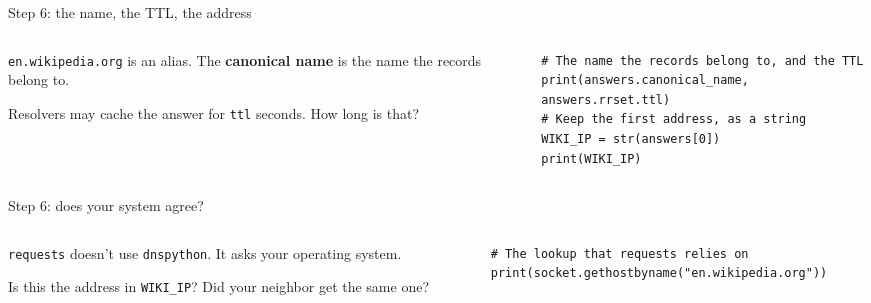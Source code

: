 \documentclass[9pt,aspectratio=169]{beamer}
\begin{document}
\begin{frame}[fragile]{Step 6: the name, the TTL, the address}
    \begin{columns}[T]
        \begin{column}{0.37\textwidth}
            \texttt{en.wikipedia.org} is an alias. The \textbf{canonical name} is the name the records belong to.

            \medskip
            Resolvers may cache the answer for \texttt{ttl} seconds. How long is that?
        \end{column}
        \begin{column}{0.6\textwidth}
\begin{lstlisting}[style=lab]
# The name the records belong to, and the TTL
print(answers.canonical_name, answers.rrset.ttl)
# Keep the first address, as a string
WIKI_IP = str(answers[0])
print(WIKI_IP)
\end{lstlisting}
        \end{column}
    \end{columns}
\end{frame}

\begin{frame}[fragile]{Step 6: does your system agree?}
    \begin{columns}[T]
        \begin{column}{0.37\textwidth}
            \texttt{requests} doesn't use \texttt{dnspython}. It asks your operating system.

            \medskip
            Is this the address in \texttt{WIKI\_IP}? Did your neighbor get the same one?
        \end{column}
        \begin{column}{0.6\textwidth}
\begin{lstlisting}[style=lab]
# The lookup that requests relies on
print(socket.gethostbyname("en.wikipedia.org"))
\end{lstlisting}
        \end{column}
    \end{columns}
\end{frame}
\end{document}
